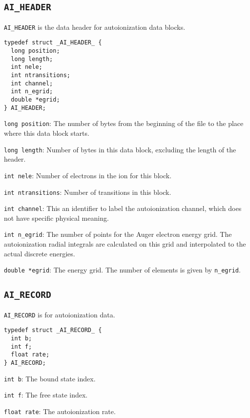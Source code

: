 \subsection{\texttt{AI\_HEADER}}
\texttt{AI\_HEADER} is the data header for autoionization data blocks.

\begin{verbatim}
typedef struct _AI_HEADER_ {
  long position;
  long length;
  int nele;
  int ntransitions;
  int channel;
  int n_egrid;
  double *egrid;
} AI_HEADER;
\end{verbatim}

\begin{dbdesc}
\item[\texttt{long position}:] The number of bytes from the beginning of the
file to the place where this data block starts.
\item[\texttt{long length}:] Number of bytes in this data block, excluding the
length of the header.
\item[\texttt{int nele}:] Number of electrons in the ion for this block.
\item[\texttt{int ntransitions}:] Number of transitions in this block.
\item[\texttt{int channel}:] This an identifier to label the autoionization
channel, which does not have specific physical meaning.
\item[\texttt{int n\_egrid}:] The number of points for the Auger electron
energy grid. The autoionization radial integrals are calculated on this grid
and interpolated to the actual discrete energies.
\item[\texttt{double *egrid}:] The energy grid. The number of elements is
given by \texttt{n\_egrid}.
\end{dbdesc}

\subsection{\texttt{AI\_RECORD}}
\texttt{AI\_RECORD} is for autoionization data.

\begin{verbatim}
typedef struct _AI_RECORD_ {
  int b;
  int f;
  float rate;
} AI_RECORD;
\end{verbatim}

\begin{dbdesc}
\item[\texttt{int b}:] The bound state index.
\item[\texttt{int f}:] The free state index.
\item[\texttt{float rate}:] The autoionization rate.
\end{dbdesc}

